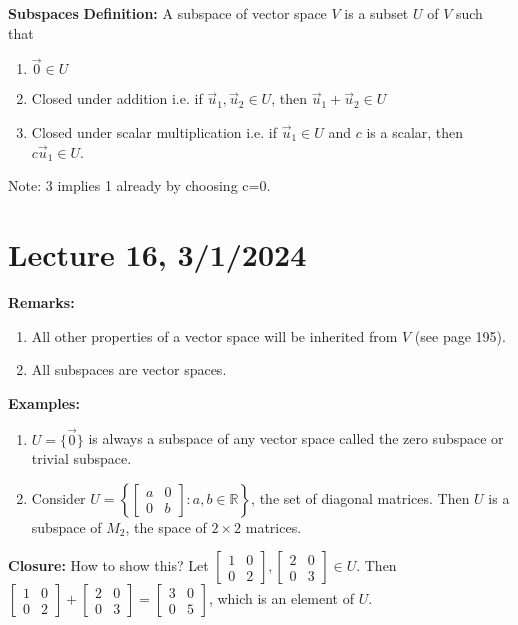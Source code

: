 \documentclass{article}
\begin{document}
\textbf{Subspaces}
\textbf{Definition:} A subspace of vector space \( V \) is a subset \( U \) of \( V \) such that
\begin{enumerate}
    \item \( \vec{0} \in U \)
    \item Closed under addition i.e. if \( \vec{u}_1, \vec{u}_2 \in U \), then \( \vec{u}_1 + \vec{u}_2 \in U \)
    \item Closed under scalar multiplication i.e. if \( \vec{u}_1 \in U \) and \( c \) is a scalar, then \( c\vec{u}_1 \in U \).
\end{enumerate}


Note: 3 implies 1 already by choosing c=0.




\section{Lecture 16, 3/1/2024}

\textbf{Remarks:}
\begin{enumerate}
    \item All other properties of a vector space will be inherited from $V$ (see page 195).
    \item All subspaces are vector spaces.
\end{enumerate}

\textbf{Examples:}
\begin{enumerate}
    \item $U = \{\vec{0}\}$ is always a subspace of any vector space called the zero subspace or trivial subspace.
    \item Consider $U = \left\{ \begin{bmatrix} a & 0 \\ 0 & b \end{bmatrix} : a, b \in \mathbb{R} \right\}$, the set of diagonal matrices. Then $U$ is a subspace of $M_2$, the space of $2 \times 2$ matrices.
\end{enumerate}

\textbf{Closure:}
How to show this? Let $\begin{bmatrix} 1 & 0 \\ 0 & 2 \end{bmatrix}, \begin{bmatrix} 2 & 0 \\ 0 & 3 \end{bmatrix} \in U$. Then $\begin{bmatrix} 1 & 0 \\ 0 & 2 \end{bmatrix} + \begin{bmatrix} 2 & 0 \\ 0 & 3 \end{bmatrix} = \begin{bmatrix} 3 & 0 \\ 0 & 5 \end{bmatrix}$, which is an element of $U$.
\end{document}
